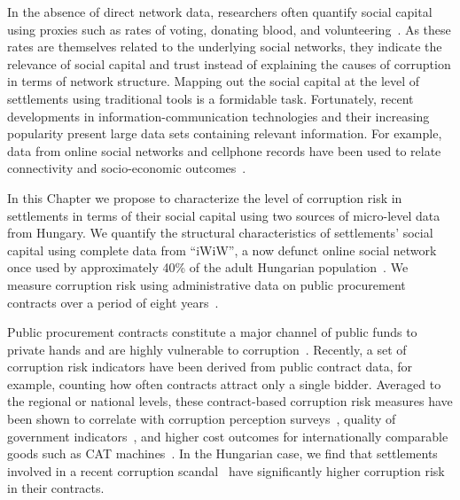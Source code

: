In the absence of direct network data, researchers often quantify social capital using proxies such as rates of voting, donating blood, and volunteering~\cite{guiso2011civic}. As these rates are themselves related to the underlying social networks, they indicate the relevance of social capital and trust instead of explaining the causes of corruption in terms of network structure. Mapping out the social capital at the level of settlements using traditional tools is a formidable task. Fortunately, recent developments in information-communication technologies and their increasing popularity present large data sets containing relevant information. For example, data from online social networks and cellphone records have been used to relate connectivity and socio-economic outcomes~\cite{eagle2010network,bokanyi2016race,mamei2018social,norbutas2018network,bailey2018social}.

In this Chapter we propose to characterize the level of corruption risk in settlements in terms of their social capital using two sources of micro-level data from Hungary. We quantify the structural characteristics of settlements' social capital using complete data from ``iWiW'', a now defunct online social network once used by approximately 40\% of the adult Hungarian population~\cite{lengyel2015geographies}. We measure corruption risk using administrative data on public procurement contracts over a period of eight years~\cite{fazekas2016objective}. 

Public procurement contracts constitute a major channel of public funds to private hands and are highly vulnerable to corruption~\cite{fazekas2017uncovering}. Recently, a set of corruption risk indicators have been derived from public contract data, for example, counting how often contracts attract only a single bidder. Averaged to the regional or national levels, these contract-based corruption risk measures have been shown to correlate with corruption perception surveys~\cite{fazekas2017uncovering}, quality of government indicators~\cite{charron2017careers}, and higher cost outcomes for internationally comparable goods such as CAT machines~\cite{fazekas2018extent}. In the Hungarian case, we find that settlements involved in a recent corruption scandal~\cite{elios} have significantly higher corruption risk in their contracts.

